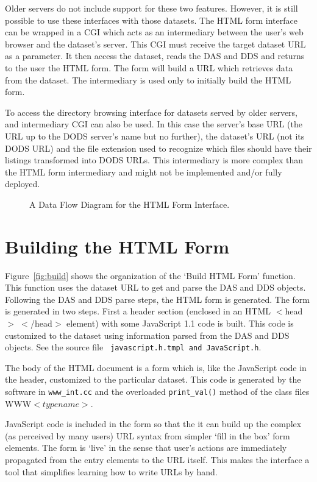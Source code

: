 \documentclass{article}
\begin{document}
Older servers do not include support for these two features. However, it is
still possible to use these interfaces with those datasets. The HTML form
interface can be wrapped in a CGI which acts as an intermediary between the
user's web browser and the dataset's server. This CGI must receive the target
dataset URL as a parameter. It then access the dataset, reads the DAS and DDS
and returns to the user the HTML form. The form will build a URL which
retrieves data from the dataset. The intermediary is used only to initially
build the HTML form.

To access the directory browsing interface for datasets served by older
servers, and intermediary CGI can also be used. In this case the server's
base URL (the URL up to the DODS server's name but no further), the dataset's
URL (not its DODS URL) and the file extension used to recognize which files
should have their listings transformed into DODS URLs. This intermediary is
more complex than the HTML form intermediary and might not be implemented
and/or fully deployed.

\begin{figure}
\centerline{}
\caption{A Data Flow Diagram for the HTML Form Interface.}
\label{fig:overall}
\end{figure}

\section{Building the HTML Form}
\label{sec:build}

Figure~\ref{fig:build} shows the organization of the `Build HTML Form'
function.  This function uses the dataset URL to get and parse the DAS and
DDS objects. Following the DAS and DDS parse steps, the HTML form is
generated. The form is generated in two steps. First a header section
(enclosed in an HTML $<$head$>$ $<$/head$>$ element) with some JavaScript 1.1
code is built. This code is customized to the dataset using information
parsed from the DAS and DDS objects. See the source file {\tt
  javascript.h.tmpl and JavaScript.h}.

The body of the HTML document is a form which is, like the JavaScript code in
the header, customized to the particular dataset. This code is generated by
the software in {\tt www\_int.cc} and the overloaded {\tt print\_val()}
method of the class files WWW$<type name>$.

JavaScript code is included in the form so that the it can build up the
complex (as perceived by many users) URL syntax from simpler `fill in the
box' form elements. The form is `live' in the sense that user's actions are
immediately propagated from the entry elements to the URL itself. This makes
the interface a tool that simplifies learning how to write URLs by hand. 
\end{document}
